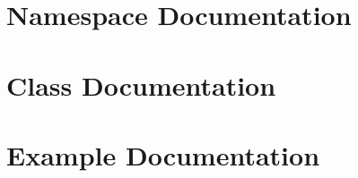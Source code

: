 \documentclass[twoside]{book}
\newcommand{\+}{\discretionary{\mbox{\scriptsize$\hookleftarrow$}}{}{}}
\begin{document}
\chapter{Namespace Documentation}

\chapter{Class Documentation}
























\chapter{Example Documentation}




\newpage
{}
{}
\printindex
\end{document}
